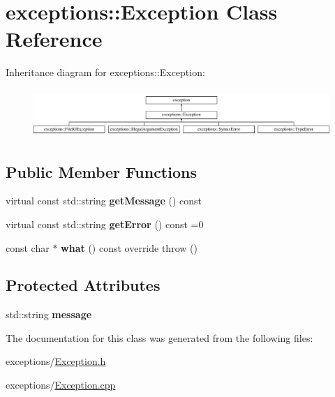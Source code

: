 \hypertarget{classexceptions_1_1Exception}{}\section{exceptions\+:\+:Exception Class Reference}
\label{classexceptions_1_1Exception}
Inheritance diagram for exceptions\+:\+:Exception\+:\begin{figure}[H]
\begin{center}
\leavevmode
\includegraphics[height=1.842105cm]{d8/db2/classexceptions_1_1Exception}
\end{center}
\end{figure}
\subsection*{Public Member Functions}
\begin{DoxyCompactItemize}
\item 
\mbox{\label{classexceptions_1_1Exception_a5cc4b7ff5b47b0cd72878380743ea1a0}} 
virtual const std\+::string {\bfseries get\+Message} () const
\item 
\mbox{\label{classexceptions_1_1Exception_ad2d7459cc4eb53de89b453b0cac9330b}} 
virtual const std\+::string {\bfseries get\+Error} () const =0
\item 
\mbox{\label{classexceptions_1_1Exception_ad51d6b57a9796fe4e28c3443a472ba21}} 
const char $\ast$ {\bfseries what} () const override  throw ()
\end{DoxyCompactItemize}
\subsection*{Protected Attributes}
\begin{DoxyCompactItemize}
\item 
\mbox{\label{classexceptions_1_1Exception_a500171f957a84170c022fa1983eb47ee}} 
std\+::string {\bfseries message}
\end{DoxyCompactItemize}


The documentation for this class was generated from the following files\+:\begin{DoxyCompactItemize}
\item 
exceptions/\hyperlink{Exception_8h}{Exception.\+h}\item 
exceptions/\hyperlink{Exception_8cpp}{Exception.\+cpp}\end{DoxyCompactItemize}
